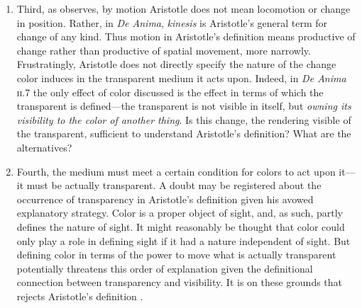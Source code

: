 \begin{enumerate}[(1)]
\item Third, as \citet[367]{Hicks:1907uq} observes, by motion Aristotle does not mean locomotion or change in position. Rather, in \emph{De Anima}, \emph{kinesis} is Aristotle's general term for change of any kind. Thus motion in Aristotle's definition means productive of change rather than productive of spatial movement, more narrowly. Frustratingly, Aristotle does not directly specify the nature of the change color induces in the transparent medium it acts upon. Indeed, in \emph{De Anima} \textsc{ii}.7 the only effect of color discussed is the effect in terms of which the transparent is defined---the transparent is not visible in itself, but \emph{owning its visibility to the color of another thing}. Is this change, the rendering visible of the transparent, sufficient to understand Aristotle's definition? What are the alternatives?
\item Fourth, the medium must meet a certain condition for colors to act upon it---it must be actually transparent. A doubt may be registered about the occurrence of transparency in Aristotle's definition given his avowed explanatory strategy. Color is a proper object of sight, and, as such, partly defines the nature of sight. It might reasonably be thought that color could only play a role in defining sight if it had a nature independent of sight. But defining color in terms of the power to move what is actually transparent potentially threatens this order of explanation given the definitional connection between transparency and visibility. It is on these grounds that \citet{Zabarella:1605kx} rejects Aristotle's definition \citep[see][for discussion]{Broackes:1999uq}.
\end{enumerate}


